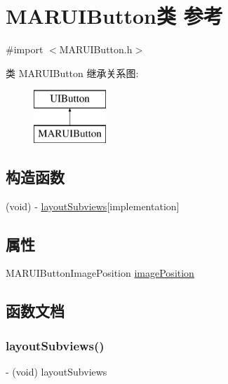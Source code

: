 \hypertarget{interface_m_a_r_u_i_button}{}\section{M\+A\+R\+U\+I\+Button类 参考}
\label{interface_m_a_r_u_i_button}


{\ttfamily \#import $<$M\+A\+R\+U\+I\+Button.\+h$>$}

类 M\+A\+R\+U\+I\+Button 继承关系图\+:\begin{figure}[H]
\begin{center}
\leavevmode
\includegraphics[height=2.000000cm]{interface_m_a_r_u_i_button}
\end{center}
\end{figure}
\subsection*{构造函数}
\begin{DoxyCompactItemize}
\item 
(void) -\/ \hyperlink{interface_m_a_r_u_i_button_ab0095ad0a302cb2b647ec690ee04606a}{layout\+Subviews}{\ttfamily  \mbox{[}implementation\mbox{]}}
\end{DoxyCompactItemize}
\subsection*{属性}
\begin{DoxyCompactItemize}
\item 
M\+A\+R\+U\+I\+Button\+Image\+Position \hyperlink{interface_m_a_r_u_i_button_a82dd59fe75c7068ccc9260f877d07e9c}{image\+Position}
\end{DoxyCompactItemize}


\subsection{函数文档}
\mbox{\label{interface_m_a_r_u_i_button_ab0095ad0a302cb2b647ec690ee04606a}} 
\subsubsection{\texorpdfstring{layout\+Subviews()}{layoutSubviews()}}
{\footnotesize\ttfamily -\/ (void) layout\+Subviews \begin{DoxyParamCaption}{ }\end{DoxyParamCaption}\hspace{0.3cm}{\ttfamily [implementation]}}



